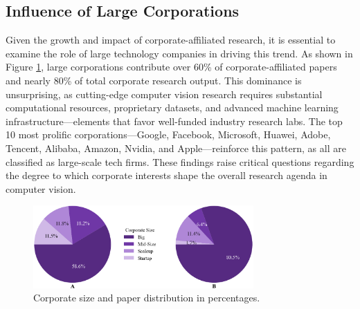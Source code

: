 \documentclass{article}
\begin{document}
\subsection{Influence of Large Corporations}
\vspace{-10pt}
Given the growth and impact of corporate-affiliated research, it is essential to examine the role of large technology companies in driving this trend. As shown in Figure \ref{fig:corporate_size_graph}, large corporations contribute over 60\% of corporate-affiliated papers and nearly 80\% of total corporate research output. This dominance is unsurprising, as cutting-edge computer vision research requires substantial computational resources, proprietary datasets, and advanced machine learning infrastructure—elements that favor well-funded industry research labs. The top 10 most prolific corporations—Google, Facebook, Microsoft, Huawei, Adobe, Tencent, Alibaba, Amazon, Nvidia, and Apple—reinforce this pattern, as all are classified as large-scale tech firms. These findings raise critical questions regarding the degree to which corporate interests shape the overall research agenda in computer vision.

\begin{figure}[ht]
  \centering
  \includegraphics[width=0.75\textwidth]{report/images/pie_charts.png}  
  \caption{Corporate size and paper distribution in percentages.}
  \label{fig:corporate_size_graph}
\end{figure}

\vspace{-10pt}
\end{document}

